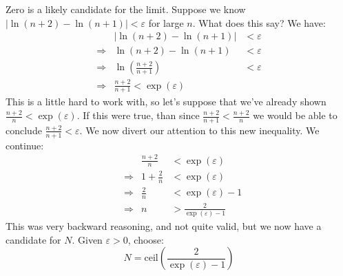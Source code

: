\documentclass{article}
\theoremstyle{normal}
\begin{document}
            Zero is a likely candidate for the limit. Suppose we know
            $|\ln(n+2)-\ln(n+1)|<\varepsilon$ for large $n$. What does this
            say? We have:
                \begin{align}
                    &&
                    |\ln(n+2)-\ln(n+1)|
                    &<
                    \varepsilon\\
                    &
                    \Longrightarrow
                    &
                    \ln(n+2)-\ln(n+1)
                    &<
                    \varepsilon\\
                    &
                    \Longrightarrow
                    &
                    \ln\left(\frac{n+2}{n+1}\right)
                    &<
                    \varepsilon\\
                    &
                    \Longrightarrow
                    &
                    \frac{n+2}{n+1}<\exp(\varepsilon)
                    &&
                \end{align}
                This is a little hard to work with, so let's suppose that
                we've already shown $\frac{n+2}{n}<\exp(\varepsilon)$. If this
                were true, than since $\frac{n+2}{n+1}<\frac{n+2}{n}$ we would
                be able to conclude $\frac{n+2}{n+1}<\varepsilon$. We now
                divert our attention to this new inequality. We continue:
                \begin{align}
                    &&
                    \frac{n+2}{n}
                    &<\exp(\varepsilon)\\
                    &
                    \Longrightarrow
                    &
                    1+\frac{2}{n}
                    &<\exp(\varepsilon)\\
                    &
                    \Longrightarrow
                    &
                    \frac{2}{n}
                    &<
                    \exp(\varepsilon)-1\\
                    &
                    \Longrightarrow
                    &
                    n
                    &>
                    \frac{2}{\exp(\varepsilon)-1}
                \end{align}
                This was very backward reasoning, and not quite valid, but we
                now have a candidate for $N$. Given $\varepsilon>0$, choose:
                \begin{equation}
                    N=\textrm{ceil}\left(
                        \frac{2}{\exp(\varepsilon)-1}
                    \right)
                \end{equation}
\end{document}

